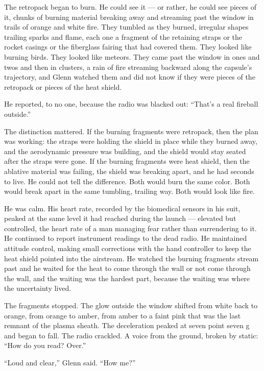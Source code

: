 \documentclass[12pt, letterpaper]{article}
\begin{document}
The retropack began to burn. He could see it --- or rather, he could see pieces of it, chunks of burning material breaking away and streaming past the window in trails of orange and white fire. They tumbled as they burned, irregular shapes trailing sparks and flame, each one a fragment of the retaining straps or the rocket casings or the fiberglass fairing that had covered them. They looked like burning birds. They looked like meteors. They came past the window in ones and twos and then in clusters, a rain of fire streaming backward along the capsule's trajectory, and Glenn watched them and did not know if they were pieces of the retropack or pieces of the heat shield.

He reported, to no one, because the radio was blacked out: ``That's a real fireball outside.''

The distinction mattered. If the burning fragments were retropack, then the plan was working: the straps were holding the shield in place while they burned away, and the aerodynamic pressure was building, and the shield would stay seated after the straps were gone. If the burning fragments were heat shield, then the ablative material was failing, the shield was breaking apart, and he had seconds to live. He could not tell the difference. Both would burn the same color. Both would break apart in the same tumbling, trailing way. Both would look like fire.

He was calm. His heart rate, recorded by the biomedical sensors in his suit, peaked at the same level it had reached during the launch --- elevated but controlled, the heart rate of a man managing fear rather than surrendering to it. He continued to report instrument readings to the dead radio. He maintained attitude control, making small corrections with the hand controller to keep the heat shield pointed into the airstream. He watched the burning fragments stream past and he waited for the heat to come through the wall or not come through the wall, and the waiting was the hardest part, because the waiting was where the uncertainty lived.

The fragments stopped. The glow outside the window shifted from white back to orange, from orange to amber, from amber to a faint pink that was the last remnant of the plasma sheath. The deceleration peaked at seven point seven g and began to fall. The radio crackled. A voice from the ground, broken by static: ``How do you read? Over.''

``Loud and clear,'' Glenn said. ``How me?''
\end{document}
